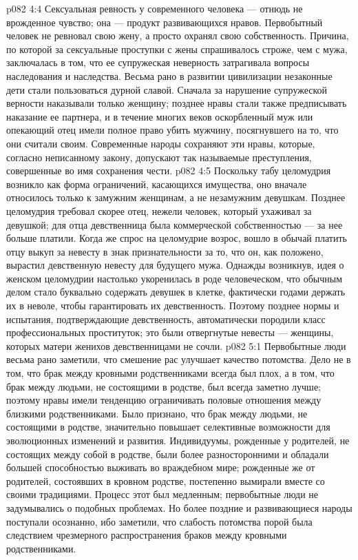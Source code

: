 \vs p082 4:4 Сексуальная ревность у современного человека --- отнюдь не врожденное чувство; она --- продукт развивающихся нравов. Первобытный человек не ревновал свою жену, а просто охранял свою собственность. Причина, по которой за сексуальные проступки с жены спрашивалось строже, чем с мужа, заключалась в том, что ее супружеская неверность затрагивала вопросы наследования и наследства. Весьма рано в развитии цивилизации незаконные дети стали пользоваться дурной славой. Сначала за нарушение супружеской верности наказывали только женщину; позднее нравы стали также предписывать наказание ее партнера, и в течение многих веков оскорбленный муж или опекающий отец имели полное право убить мужчину, посягнувшего на то, что они считали своим. Современные народы сохраняют эти нравы, которые, согласно неписанному закону, допускают так называемые преступления, совершенные во имя сохранения чести.
\vs p082 4:5 Поскольку табу целомудрия возникло как форма ограничений, касающихся имущества, оно вначале относилось только к замужним женщинам, а не незамужним девушкам. Позднее целомудрия требовал скорее отец, нежели человек, который ухаживал за девушкой; для отца девственница была коммерческой собственностью --- за нее больше платили. Когда же спрос на целомудрие возрос, вошло в обычай платить отцу выкуп за невесту в знак признательности за то, что он, как положено, вырастил девственную невесту для будущего мужа. Однажды возникнув, идея о женском целомудрии настолько укоренилась в роде человеческом, что обычным делом стало буквально содержать девушек в клетке, фактически годами держать их в неволе, чтобы гарантировать их девственность. Поэтому позднее нормы и испытания, подтверждающие девственность, автоматически породили класс профессиональных проституток; это были отвергнутые невесты --- женщины, которых матери женихов девственницами не сочли.
\vs p082 5:1 Первобытные люди весьма рано заметили, что смешение рас улучшает качество потомства. Дело не в том, что брак между кровными родственниками всегда был плох, а в том, что брак между людьми, не состоящими в родстве, был всегда заметно лучше; поэтому нравы имели тенденцию ограничивать половые отношения между близкими родственниками. Было признано, что брак между людьми, не состоящими в родстве, значительно повышает селективные возможности для эволюционных изменений и развития. Индивидуумы, рожденные у родителей, не состоящих между собой в родстве, были более разносторонними и обладали большей способностью выживать во враждебном мире; рожденные же от родителей, состоявших в кровном родстве, постепенно вымирали вместе со своими традициями. Процесс этот был медленным; первобытные люди не задумывались о подобных проблемах. Но более поздние и развивающиеся народы поступали осознанно, ибо заметили, что слабость потомства порой была следствием чрезмерного распространения браков между кровными родственниками.
